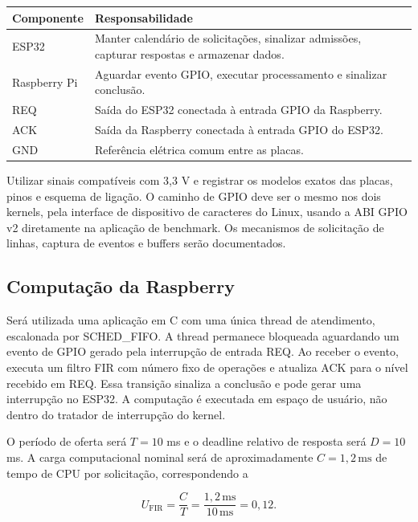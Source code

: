 \documentclass[11pt,a4paper]{article}
\begin{document}
\begin{center}
\begin{tabularx}{\textwidth}{lY}
\toprule
Componente & Responsabilidade \\
\midrule
ESP32 & Manter calendário de solicitações, sinalizar admissões, capturar respostas e armazenar dados. \\
Raspberry Pi & Aguardar evento GPIO, executar processamento e sinalizar conclusão. \\
REQ & Saída do ESP32 conectada à entrada GPIO da Raspberry. \\
ACK & Saída da Raspberry conectada à entrada GPIO do ESP32. \\
GND & Referência elétrica comum entre as placas. \\
\bottomrule
\end{tabularx}
\end{center}

Utilizar sinais compatíveis com 3,3 V e registrar os modelos exatos das placas, pinos e esquema de ligação. O caminho de GPIO deve ser o mesmo nos dois kernels, pela interface de dispositivo de caracteres do Linux, usando a ABI GPIO v2 diretamente na aplicação de benchmark. Os mecanismos de solicitação de linhas, captura de eventos e buffers serão documentados.

\subsection{Computação da Raspberry}

Será utilizada uma aplicação em C com uma única thread de atendimento, escalonada por SCHED\_FIFO. A thread permanece bloqueada aguardando um evento de GPIO gerado pela interrupção de entrada REQ. Ao receber o evento, executa um filtro FIR com número fixo de operações e atualiza ACK para o nível recebido em REQ. Essa transição sinaliza a conclusão e pode gerar
uma interrupção no ESP32. A computação é executada em espaço de usuário, não dentro do tratador de interrupção do kernel.

O período de oferta será $T=10$ ms e o deadline relativo de resposta será $D=10$ ms. A carga computacional nominal será de aproximadamente $C=1{,}2\,\mathrm{ms}$ de tempo de CPU por solicitação, correspondendo a

\begin{equation}
    U_{\mathrm{FIR}} =
    \frac{C}{T} =
    \frac{1{,}2\,\mathrm{ms}}{10\,\mathrm{ms}} =
    0{,}12.
\end{equation}
\end{document}
